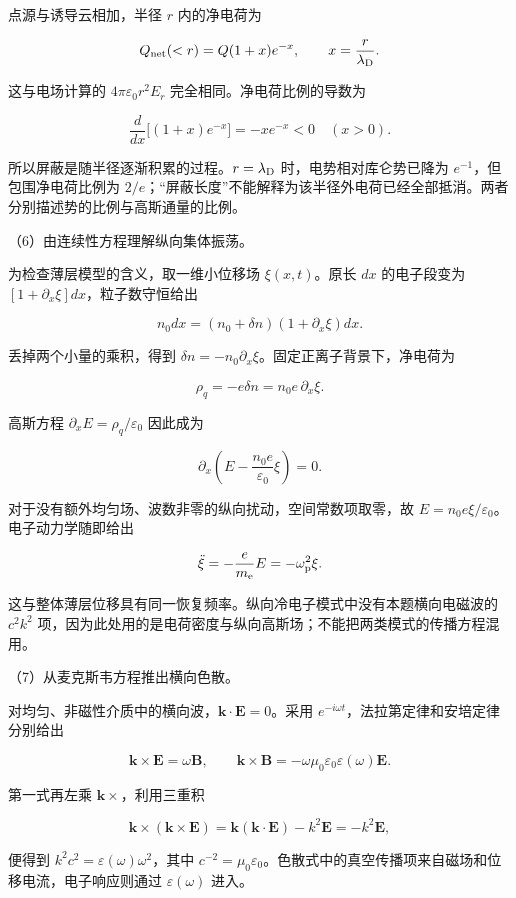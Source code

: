 \documentclass[12pt,a4paper,fontset=fandol]{ctexart}
\begin{document}
点源与诱导云相加，半径 \(r\) 内的净电荷为

\[
Q_{\rm net}(<r)=Q(1+x)e^{-x},\qquad x=\frac r{\lambda_{\rm D}}.
\]

这与电场计算的 \(4\pi\varepsilon_0r^2E_r\) 完全相同。净电荷比例的导数为

\[
\frac d{dx}\big[(1+x)e^{-x}\big]=-xe^{-x}<0\quad(x>0).
\]

所以屏蔽是随半径逐渐积累的过程。\(r=\lambda_{\rm D}\)
时，电势相对库仑势已降为 \(e^{-1}\)，但包围净电荷比例为
\(2/e\)；``屏蔽长度''不能解释为该半径外电荷已经全部抵消。两者分别描述势的比例与高斯通量的比例。

（6）由连续性方程理解纵向集体振荡。

为检查薄层模型的含义，取一维小位移场 \(\xi(x,t)\)。原长 \(dx\)
的电子段变为 \([1+\partial_x\xi]dx\)，粒子数守恒给出

\[
n_0dx=(n_0+\delta n)(1+\partial_x\xi)dx.
\]

丢掉两个小量的乘积，得到
\(\delta n=-n_0\partial_x\xi\)。固定正离子背景下，净电荷为

\[
\rho_q=-e\delta n=n_0e\,\partial_x\xi.
\]

高斯方程 \(\partial_xE=\rho_q/\varepsilon_0\) 因此成为

\[
\partial_x\left(E-\frac{n_0e}{\varepsilon_0}\xi\right)=0.
\]

对于没有额外均匀场、波数非零的纵向扰动，空间常数项取零，故
\(E=n_0e\xi/\varepsilon_0\)。电子动力学随即给出

\[
\ddot\xi=-\frac e{m_{\rm e}}E=-\omega_{\rm p}^2\xi.
\]

这与整体薄层位移具有同一恢复频率。纵向冷电子模式中没有本题横向电磁波的
\(c^2k^2\)
项，因为此处用的是电荷密度与纵向高斯场；不能把两类模式的传播方程混用。

（7）从麦克斯韦方程推出横向色散。

对均匀、非磁性介质中的横向波，\(\boldsymbol k\cdot\boldsymbol E=0\)。采用
\(e^{-i\omega t}\)，法拉第定律和安培定律分别给出

\[
\boldsymbol k\times\boldsymbol E=\omega\boldsymbol B,\qquad
\boldsymbol k\times\boldsymbol B
=-\omega\mu_0\varepsilon_0\varepsilon(\omega)\boldsymbol E.
\]

第一式再左乘 \(\boldsymbol k\times\)，利用三重积

\[
\boldsymbol k\times(\boldsymbol k\times\boldsymbol E)
=\boldsymbol k(\boldsymbol k\cdot\boldsymbol E)-k^2\boldsymbol E
=-k^2\boldsymbol E,
\]

便得到 \(k^2c^2=\varepsilon(\omega)\omega^2\)，其中
\(c^{-2}=\mu_0\varepsilon_0\)。色散式中的真空传播项来自磁场和位移电流，电子响应则通过
\(\varepsilon(\omega)\) 进入。
\end{document}
